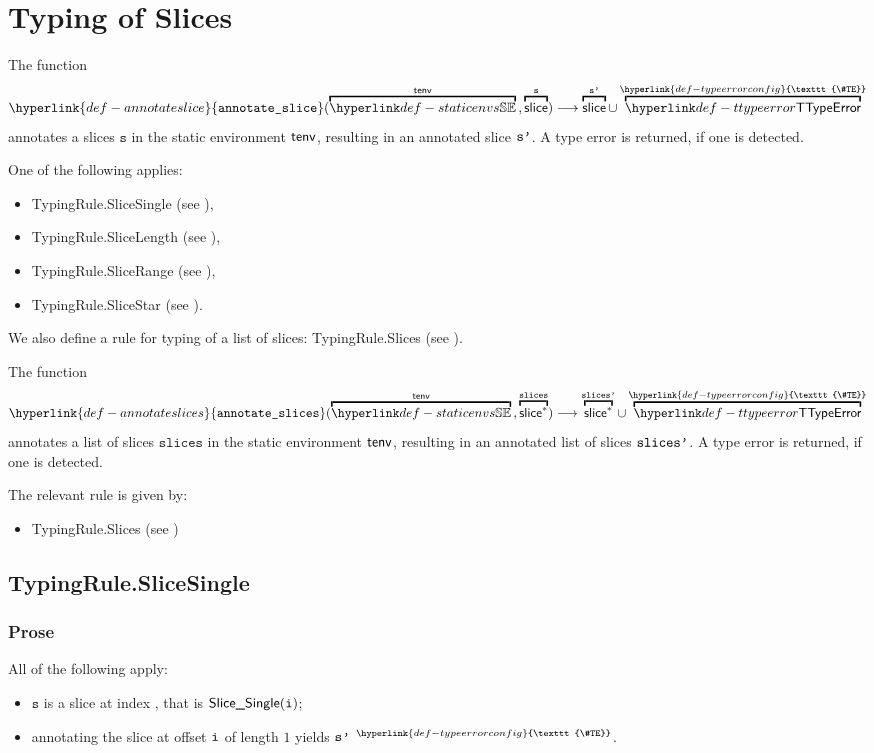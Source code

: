 \documentclass{book}
\newcommand\TypeErrorConfig[0]{\hyperlink{def-typeerrorconfig}{\texttt{\#TE}}}
\newcommand\ProseOrTypeError[0]{\hyperlink{def-proseortypeerror}{$^{\TypeErrorConfig}$}}
\newcommand\annotateslice[0]{\hyperlink{def-annotateslice}{\texttt{annotate\_slice}}}
\newcommand\annotateslices[0]{\hyperlink{def-annotateslices}{\texttt{annotate\_slices}}}
\newcommand\vs[0]{\texttt{s}}
\newcommand\slices[0]{\texttt{slices}}
\begin{document}
\chapter{Typing of Slices \label{chap:typingslices}}
\hypertarget{def-annotateslice}{}
The function
\[
  \annotateslice(\overname{\staticenvs}{\tenv} \aslsep \overname{\slice}{\vs})
  \aslto
  \overname{\slice}{\vsp} \cup \overname{\TTypeError}{\TypeErrorConfig}
\]
annotates a slices $\vs$ in the static environment $\textsf{tenv}$,
resulting in an annotated slice $\texttt{s'}$.
A type error is returned, if one is detected.

One of the following applies:
\begin{itemize}
\item TypingRule.SliceSingle (see ),
\item TypingRule.SliceLength (see ),
\item TypingRule.SliceRange (see ),
\item TypingRule.SliceStar (see ).
\end{itemize}

We also define a rule for typing of a list of slices:
TypingRule.Slices (see ).

\hypertarget{def-annotateslices}{}
The function
\[
  \annotateslices(\overname{\staticenvs}{\tenv} \aslsep \overname{\slice^*}{\slices})
  \aslto
  \overname{\slice^*}{\slicesp} \cup \overname{\TTypeError}{\TypeErrorConfig}
\]
annotates a list of slices $\slices$ in the static environment $\textsf{tenv}$,
resulting in an annotated list of slices $\texttt{slices'}$.
A type error is returned, if one is detected.

The relevant rule is given by:
\begin{itemize}
  \item TypingRule.Slices (see )
\end{itemize}

\section{TypingRule.SliceSingle \label{sec:TypingRule.SliceSingle}}

\subsection{Prose}
All of the following apply:
\begin{itemize}
  \item $\vs$ is a slice at index \vi, that is $\textsf{Slice\_Single}(\texttt{i})$;
  \item annotating the slice at offset $\texttt{i}$ of length $1$ yields $\texttt{s'}$ \ProseOrTypeError.
\end{itemize}
\end{document}
